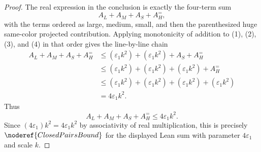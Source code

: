 \begin{proof}
The real expression in the conclusion is exactly the four-term sum
\[
A_L+A_M+A_S+A_H^{=},
\]
with the terms ordered as large, medium, small, and then the parenthesized
huge same-color projected contribution.  Applying monotonicity of addition to
(1), (2), (3), and (4) in that order gives the line-by-line chain
\[
\begin{aligned}
A_L+A_M+A_S+A_H^{=}
&\le
(\varepsilon_1k^2)+(\varepsilon_1k^2)+A_S+A_H^{=}\\
&\le
(\varepsilon_1k^2)+(\varepsilon_1k^2)+(\varepsilon_1k^2)+A_H^{=}\\
&\le
(\varepsilon_1k^2)+(\varepsilon_1k^2)+(\varepsilon_1k^2)
  +(\varepsilon_1k^2)\\
&=4\varepsilon_1k^2.
\end{aligned}
\]
Thus
\[
A_L+A_M+A_S+A_H^{=}
\le 4\varepsilon_1k^2.
\]
Since \((4\varepsilon_1)k^2=4\varepsilon_1k^2\) by associativity of real
multiplication, this is precisely
\(\noderef{ClosedPairsBound}\) for the displayed Lean sum with parameter
\(4\varepsilon_1\) and scale \(k\).
\end{proof}
